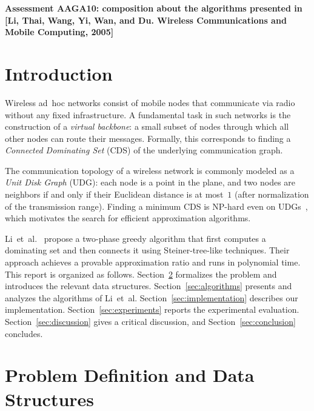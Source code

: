 \documentclass[11pt,a4paper]{article}
\begin{document}


\begin{center}
\large{\bf{Assessment AAGA10: composition about the algorithms presented in
[Li, Thai, Wang, Yi, Wan, and Du. Wireless Communications and
Mobile Computing, 2005]}}
\end{center}

\section{Introduction}\label{sec:intro}

Wireless ad~hoc networks consist of mobile nodes that communicate via radio
without any fixed infrastructure.  A fundamental task in such networks is the
construction of a \emph{virtual backbone}: a small subset of nodes through which
all other nodes can route their messages.  Formally, this corresponds to finding
a \emph{Connected Dominating Set} (CDS) of the underlying communication graph.

The communication topology of a wireless network is commonly modeled as a
\emph{Unit Disk Graph} (UDG): each node is a point in the plane, and two nodes
are neighbors if and only if their Euclidean distance is at most~$1$ (after
normalization of the transmission range).  Finding a minimum CDS is NP-hard even
on UDGs~\cite{clark1990}, which motivates the search for efficient approximation
algorithms.

Li~et~al.~\cite{li2005} propose a two-phase greedy algorithm that first computes
a dominating set and then connects it using Steiner-tree-like techniques.  Their
approach achieves a provable approximation ratio and runs in polynomial time.
This report is organized as follows.  Section~\ref{sec:problem} formalizes the
problem and introduces the relevant data structures.
Section~\ref{sec:algorithms} presents and analyzes the algorithms of
Li~et~al.  Section~\ref{sec:implementation} describes our implementation.
Section~\ref{sec:experiments} reports the experimental evaluation.
Section~\ref{sec:discussion} gives a critical discussion, and
Section~\ref{sec:conclusion} concludes.

\section{Problem Definition and Data Structures}\label{sec:problem}
\end{document}
